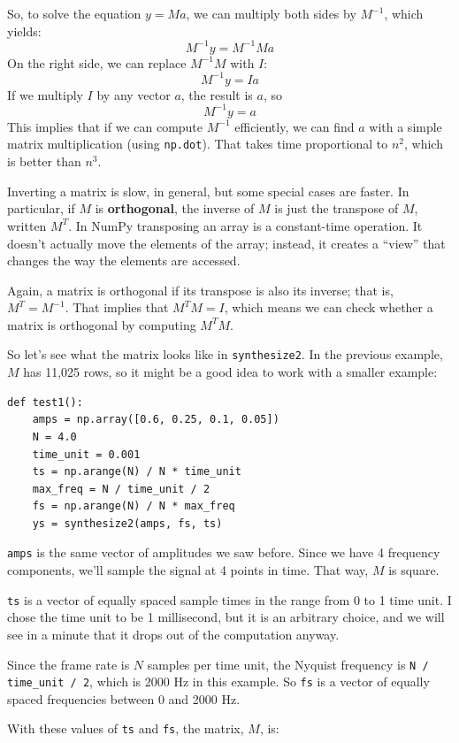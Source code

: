 \documentclass[12pt]{book}
\begin{document}
So, to solve the equation $y = Ma$, we can multiply both sides by
$M^{-1}$, which yields:
%
\[ M^{-1}y = M^{-1} M a \]
%
On the right side, we can replace $M^{-1}M$ with $I$:
%
\[ M^{-1}y = I a \]
%
If we multiply $I$ by any vector $a$, the result is $a$, so
%
\[ M^{-1}y = a \]
%
This implies that if we can compute $M^{-1}$ efficiently, we can find
$a$ with a simple matrix multiplication (using {\tt np.dot}).  That
takes time proportional to $n^2$, which is better than $n^3$.

Inverting a matrix is slow, in general, but some special cases are
faster.  In particular, if $M$ is {\bf orthogonal}, the inverse of $M$
is just the transpose of $M$, written $M^T$.  In NumPy
transposing an array is a constant-time operation.  It
doesn't actually move the elements of the array; instead, it creates a
``view'' that changes the way the elements are accessed.

Again, a matrix is orthogonal if its transpose is also its inverse;
that is, $M^T = M^{-1}$.  That implies that $M^TM = I$, which means we
can check whether a matrix is orthogonal by computing $M^TM$.

So let's see what the matrix looks like in {\tt synthesize2}.  In
the previous example, $M$ has 11,025 rows, so it might be a good idea
to work with a smaller example:

\begin{verbatim}
def test1():
    amps = np.array([0.6, 0.25, 0.1, 0.05])
    N = 4.0
    time_unit = 0.001
    ts = np.arange(N) / N * time_unit
    max_freq = N / time_unit / 2
    fs = np.arange(N) / N * max_freq
    ys = synthesize2(amps, fs, ts)
\end{verbatim}

{\tt amps} is the same vector of amplitudes we saw before.
Since we have 4 frequency components, we'll sample the signal
at 4 points in time.  That way, $M$ is square.

{\tt ts} is a vector of equally spaced sample times in the range from
0 to 1 time unit.  I chose the time unit to be 1 millisecond, but it
is an arbitrary choice, and we will see in a minute that it drops out
of the computation anyway.

Since the frame rate is $N$ samples per time unit, the Nyquist
frequency is \verb"N / time_unit / 2", which is 2000 Hz in this
example.  So {\tt fs} is a vector of equally spaced frequencies
between 0 and 2000 Hz.

With these values of {\tt ts} and {\tt fs}, the matrix, $M$, is:
\end{document}
